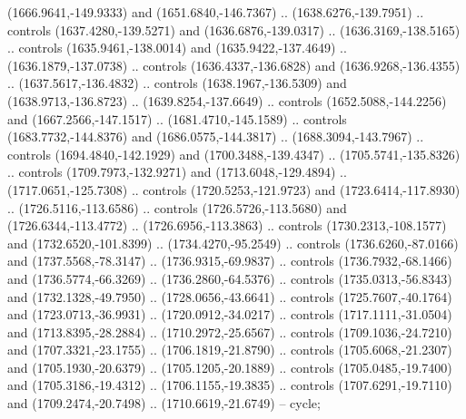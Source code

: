 \begin{scope}[shift={(-22.88722,-49.76189)}]
\begin{scope}[shift={(-739.46591,328.36782)}]
      (1666.9641,-149.9333) and (1651.6840,-146.7367) .. (1638.6276,-139.7951) ..
      controls (1637.4280,-139.5271) and (1636.6876,-139.0317) ..
      (1636.3169,-138.5165) .. controls (1635.9461,-138.0014) and
      (1635.9422,-137.4649) .. (1636.1879,-137.0738) .. controls
      (1636.4337,-136.6828) and (1636.9268,-136.4355) .. (1637.5617,-136.4832) ..
      controls (1638.1967,-136.5309) and (1638.9713,-136.8723) ..
      (1639.8254,-137.6649) .. controls (1652.5088,-144.2256) and
      (1667.2566,-147.1517) .. (1681.4710,-145.1589) .. controls
      (1683.7732,-144.8376) and (1686.0575,-144.3817) .. (1688.3094,-143.7967) ..
      controls (1694.4840,-142.1929) and (1700.3488,-139.4347) ..
      (1705.5741,-135.8326) .. controls (1709.7973,-132.9271) and
      (1713.6048,-129.4894) .. (1717.0651,-125.7308) .. controls
      (1720.5253,-121.9723) and (1723.6414,-117.8930) .. (1726.5116,-113.6586) ..
      controls (1726.5726,-113.5680) and (1726.6344,-113.4772) ..
      (1726.6956,-113.3863) .. controls (1730.2313,-108.1577) and
      (1732.6520,-101.8399) .. (1734.4270,-95.2549) .. controls (1736.6260,-87.0166)
      and (1737.5568,-78.3147) .. (1736.9315,-69.9837) .. controls
      (1736.7932,-68.1466) and (1736.5774,-66.3269) .. (1736.2860,-64.5376) ..
      controls (1735.0313,-56.8343) and (1732.1328,-49.7950) .. (1728.0656,-43.6641)
      .. controls (1725.7607,-40.1764) and (1723.0713,-36.9931) ..
      (1720.0912,-34.0217) .. controls (1717.1111,-31.0504) and (1713.8395,-28.2884)
      .. (1710.2972,-25.6567) .. controls (1709.1036,-24.7210) and
      (1707.3321,-23.1755) .. (1706.1819,-21.8790) .. controls (1705.6068,-21.2307)
      and (1705.1930,-20.6379) .. (1705.1205,-20.1889) .. controls
      (1705.0485,-19.7400) and (1705.3186,-19.4312) .. (1706.1155,-19.3835) ..
      controls (1707.6291,-19.7110) and (1709.2474,-20.7498) .. (1710.6619,-21.6749)
      -- cycle;


\end{scope}
\end{scope}
